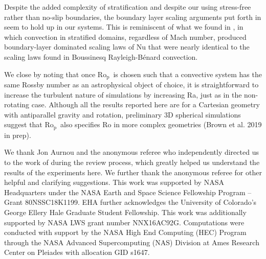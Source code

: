 \documentclass[twocolumn, amsmath, amsfonts, amssymb, trackchanges]{aastex62}
\newcommand{\RB}{Rayleigh-B\'{e}nard }
\newcommand{\pro}{\ensuremath{\text{Ro}_{\text{p}}}}
\begin{document}
Despite the added complexity of stratification and despite our using stress-free rather than
no-slip boundaries, the boundary layer scaling arguments put forth in \cite{king&all2012} seem
to hold up in our systems. This is reminiscent of what we found in \AB, in which
convection in stratified domains, regardless of Mach number, produced boundary-layer
dominated scaling laws of Nu that were nearly identical to the scaling laws found in
Boussinesq \RB convection.

We close by noting that once \pro$\,$ is chosen such that a convective system has the same
Rossby number as an astrophysical object of choice, it is straightforward to increase the 
turbulent nature of 
simulations by increasing Ra, just as in the non-rotating case.
Although all the results reported here are for a Cartesian geometry with 
antiparallel gravity and rotation, preliminary 3D spherical simulations suggest that 
\pro$\,$ also specifies Ro in more complex geometries (Brown et al. 2019 in prep).


\begin{acknowledgements}
We thank Jon Aurnou and the anonymous referee who independently directed
us to the work of \citet{king&all2012} during the review process, which greatly
helped us understand the results of the experiments here. We further thank
the anonymous referee for other helpful and clarifying suggestions.
This work was supported by NASA Headquarters under the NASA Earth and Space
Science Fellowship Program -- Grant 80NSSC18K1199.
EHA further acknowledges the University of Colorado's George 
Ellery Hale Graduate Student Fellowship.
This work was additionally supported by  NASA LWS grant number NNX16AC92G.  
Computations were conducted 
with support by the NASA High End Computing (HEC) Program through the NASA 
Advanced Supercomputing (NAS) Division at Ames Research Center on Pleiades
with allocation GID s1647.
\end{acknowledgements}



\listofchanges
\end{document}
